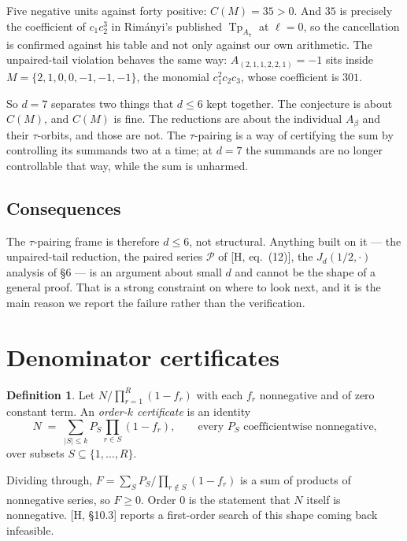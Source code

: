 \documentclass[11pt,a4paper]{article}
\DeclareMathOperator{\Tp}{Tp}
\theoremstyle{plain}
\theoremstyle{definition}
\newtheorem{definition}[proposition]{Definition}
\theoremstyle{remark}
\begin{document}
Five negative units against forty positive: $C(M) = 35 > 0$.  And $35$ is precisely the
coefficient of $c_1 c_2^3$ in Rim\'anyi's published $\Tp_{A_7}$ at $\ell = 0$, so the cancellation
is confirmed against his table and not only against our own arithmetic.  The unpaired-tail
violation behaves the same way: $A_{(2,1,1,2,2,1)} = -1$ sits inside
$M = \{2,1,0,0,-1,-1,-1\}$, the monomial $c_1^2 c_2 c_3$, whose coefficient is $301$.

So $d = 7$ separates two things that $d \le 6$ kept together.  The conjecture is about $C(M)$, and
$C(M)$ is fine.  The reductions are about the individual $A_\beta$ and their $\tau$-orbits, and
those are not.  The $\tau$-pairing is a way of certifying the sum by controlling its summands two
at a time; at $d = 7$ the summands are no longer controllable that way, while the sum is unharmed.

\subsection{Consequences}

The $\tau$-pairing frame is therefore $d \le 6$, not structural.  Anything built on it --- the
unpaired-tail reduction, the paired series $\mathcal{P}$ of [H, eq.~(12)], the $J_d(1/2,\cdot)$
analysis of \S6 --- is an argument about small $d$ and cannot be the shape of a general proof.
That is a strong constraint on where to look next, and it is the main reason we report the failure
rather than the verification.

\section{Denominator certificates}
\label{sec:certificates}

\begin{definition}
Let $N / \prod_{r=1}^{R}(1 - f_r)$ with each $f_r$ nonnegative and of zero constant term. An
\emph{order-$k$ certificate} is an identity
\[
  N \;=\; \sum_{|S| \le k} P_S \prod_{r \in S}(1 - f_r),
  \qquad \text{every } P_S \text{ coefficientwise nonnegative,}
\]
over subsets $S \subseteq \{1, \dots, R\}$.
\end{definition}

Dividing through, $F = \sum_S P_S / \prod_{r \notin S}(1 - f_r)$ is a sum of products of
nonnegative series, so $F \ge 0$. Order $0$ is the statement that $N$ itself is nonnegative.
[H, \S10.3] reports a first-order search of this shape coming back infeasible.
\end{document}
